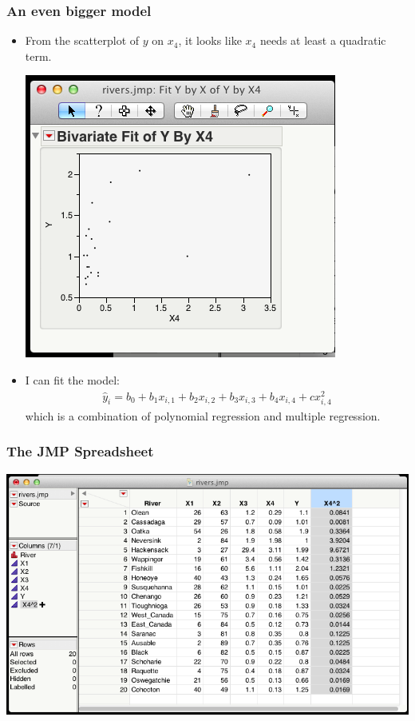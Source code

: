 \documentclass[handout]{beamer}\usepackage{graphicx, color}
\providecommand{\wh}[1]{\widehat{#1}}
\numberwithin{equation}{section}
\begin{document}
\begin{frame}
\frametitle{An even bigger model} \small  
\begin{itemize}
\pause \item From the scatterplot of $y$ on $x_4$, it looks like $x_4$ needs at least a quadratic term.
\begin{center}
 \includegraphics{../../fig/x41.png}
\end{center}
\pause \item I can fit the model:
\begin{align*}
\wh{y}_i = b_0 + b_1 x_{i, 1}  + b_2 x_{i, 2} + b_3 x_{i, 3} + b_4 x_{i, 4}  + c x_{i, 4}^2
\end{align*}
\pause which is a combination of polynomial regression and multiple regression.
\end{itemize}
\end{frame}

\begin{frame}
\frametitle{The JMP Spreadsheet}
\begin{center}
 \includegraphics{../../fig/x42.png}
\end{center}
\end{frame}
\end{document}
